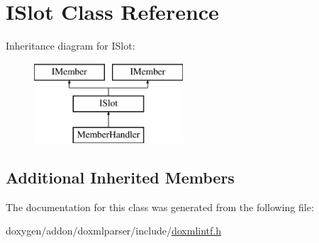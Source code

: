 \hypertarget{class_i_slot}{}\section{I\+Slot Class Reference}
\label{class_i_slot}
Inheritance diagram for I\+Slot\+:\begin{figure}[H]
\begin{center}
\leavevmode
\includegraphics[height=3.000000cm]{class_i_slot}
\end{center}
\end{figure}
\subsection*{Additional Inherited Members}


The documentation for this class was generated from the following file\+:\begin{DoxyCompactItemize}
\item 
doxygen/addon/doxmlparser/include/\mbox{\hyperlink{include_2doxmlintf_8h}{doxmlintf.\+h}}\end{DoxyCompactItemize}

